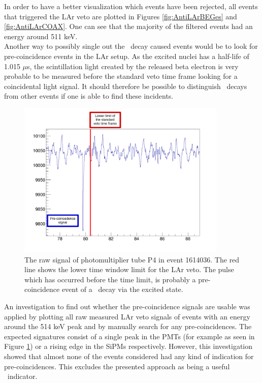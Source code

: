 \documentclass[encoding=utf8,british]{tumphthesis}
\begin{document}
In order to have a better visualization which events have been rejected, all events that triggered the LAr veto are plotted in Figures \ref{fig:AntiLArBEGes} and \ref{fig:AntiLArCOAX}.
One can see that the majority of the filtered events had an energy around 511 keV.
\\

Another way to possibly single out the \Kr\ decay caused events would be to look for pre-coincidence events in the LAr setup.
As the excited  nuclei has a half-life of 1.015 $\unit{\mu}$s, the scintillation light created by the released beta electron is very probable to be measured before the standard veto time frame looking for a coincidental light signal.
It should therefore be possible to distinguish \Kr\ decays from other events if one is able to find these incidents.
\\


\begin{figure}[t!]
	\centering
	\ifmakefigures%
	\includegraphics[width=100mm]{./Bilder/Beispiel.pdf}
	\fi%

	\caption{
    The raw signal of photomultiplier tube P4 in event 1614036. 
    The red line shows the lower time window limit for the LAr veto.
    The pulse which has occurred before the time limit, is probably a pre-coincidence event of a \Kr\ decay via the excited  state.
    }
    	\label{fig:BeispielSignal}
    			\vspace{5mm}
\end{figure}


An investigation to find out whether the pre-coincidence signals are usable was applied by plotting all raw measured LAr veto signals of events with an energy around the 514 keV peak and by manually search for any pre-coincidences.
The expected signatures consist of a single peak in the PMTs (for example as seen in Figure \ref{fig:BeispielSignal}) or a rising edge in the SiPMs respectively.
However, this investigation showed that almost none of the events considered had any kind of indication for pre-coincidences.
This excludes the presented approach as being a useful \Kr\ indicator.
\end{document}
